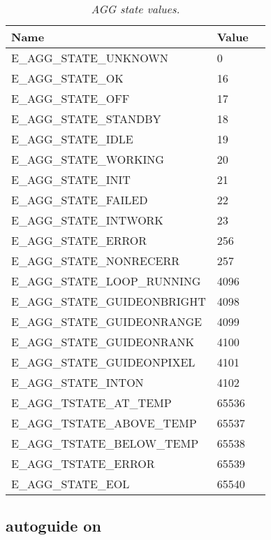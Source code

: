\documentclass[10pt,a4paper]{article}
\begin{document}
\begin{table}[!h]
\begin{center}
\begin{tabular}{|l|l|p{20em}|}
\hline
{\bf Name}                   & {\bf Value} \\ \hline
E\_AGG\_STATE\_UNKNOWN       & 0     \\ \hline
E\_AGG\_STATE\_OK            & 16    \\ \hline
E\_AGG\_STATE\_OFF           & 17    \\ \hline
E\_AGG\_STATE\_STANDBY       & 18    \\ \hline
E\_AGG\_STATE\_IDLE          & 19    \\ \hline
E\_AGG\_STATE\_WORKING       & 20    \\ \hline
E\_AGG\_STATE\_INIT          & 21    \\ \hline
E\_AGG\_STATE\_FAILED        & 22    \\ \hline
E\_AGG\_STATE\_INTWORK       & 23    \\ \hline
E\_AGG\_STATE\_ERROR         & 256   \\ \hline
E\_AGG\_STATE\_NONRECERR     & 257   \\ \hline
E\_AGG\_STATE\_LOOP\_RUNNING & 4096  \\ \hline
E\_AGG\_STATE\_GUIDEONBRIGHT & 4098  \\ \hline
E\_AGG\_STATE\_GUIDEONRANGE  & 4099  \\ \hline
E\_AGG\_STATE\_GUIDEONRANK   & 4100  \\ \hline
E\_AGG\_STATE\_GUIDEONPIXEL  & 4101  \\ \hline
E\_AGG\_STATE\_INTON         & 4102  \\ \hline
E\_AGG\_TSTATE\_AT\_TEMP     & 65536 \\ \hline
E\_AGG\_TSTATE\_ABOVE\_TEMP  & 65537 \\ \hline
E\_AGG\_TSTATE\_BELOW\_TEMP  & 65538 \\ \hline
E\_AGG\_TSTATE\_ERROR        & 65539 \\ \hline
E\_AGG\_STATE\_EOL           & 65540 \\ \hline
\end{tabular}
\end{center}
\caption{\em AGG state values.}
\label{tab:aggstatevalues}
\end{table}

\subsection{autoguide on}
\end{document}
